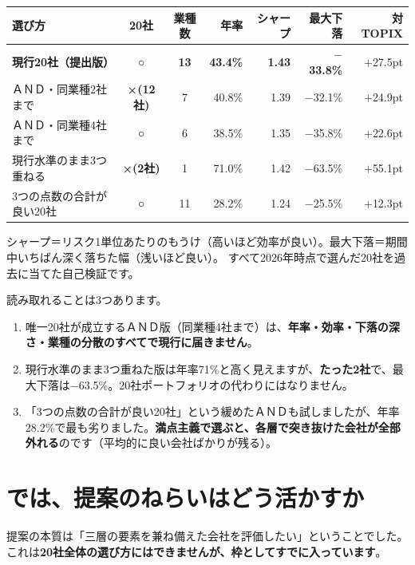 \documentclass[a4paper,10.5pt]{article}
\begin{document}
\begin{center}
\small
\begin{tabular}{lccrrrr}
\toprule
選び方 & 20社 & 業種数 & 年率 & シャープ & 最大下落 & 対TOPIX \\
\midrule
\textbf{現行20社（提出版）} & ○ & \textbf{13} & \textbf{43.4\%} & \textbf{1.43} & \textbf{$-$33.8\%} & $+$27.5pt \\
ＡＮＤ・同業種2社まで & \textbf{×(12社)} & 7 & 40.8\% & 1.39 & $-$32.1\% & $+$24.9pt \\
ＡＮＤ・同業種4社まで & ○ & 6 & 38.5\% & 1.35 & $-$35.8\% & $+$22.6pt \\
現行水準のまま3つ重ねる & \textbf{×(2社)} & 1 & 71.0\% & 1.42 & $-$63.5\% & $+$55.1pt \\
3つの点数の合計が良い20社 & ○ & 11 & 28.2\% & 1.24 & $-$25.5\% & $+$12.3pt \\
\bottomrule
\end{tabular}
\end{center}

{\footnotesize
シャープ＝リスク1単位あたりのもうけ（高いほど効率が良い）。最大下落＝期間中いちばん深く落ちた幅（浅いほど良い）。
すべて2026年時点で選んだ20社を過去に当てた自己検証です。\par}

読み取れることは3つあります。

\begin{enumerate}[leftmargin=1.4em,itemsep=2pt]
\item 唯一20社が成立するＡＮＤ版（同業種4社まで）は、\textbf{年率・効率・下落の深さ・業種の分散のすべてで現行に届きません}。
\item 現行水準のまま3つ重ねた版は年率71\%と高く見えますが、\textbf{たった2社}で、最大下落は$-$63.5\%。20社ポートフォリオの代わりにはなりません。
\item 「3つの点数の合計が良い20社」という緩めたＡＮＤも試しましたが、年率28.2\%で最も劣りました。\textbf{満点主義で選ぶと、各層で突き抜けた会社が全部外れる}のです（平均的に良い会社ばかりが残る）。
\end{enumerate}

\section{では、提案のねらいはどう活かすか}

提案の本質は「三層の要素を兼ね備えた会社を評価したい」ということでした。
これは\textbf{20社全体の選び方にはできませんが、枠としてすでに入っています}。
\end{document}
